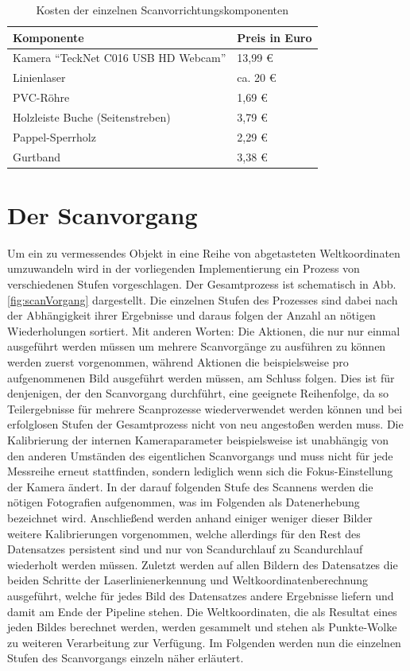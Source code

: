 \begin{table} %
	\centering
		\begin{tabular}{l | l}
		\textbf{Komponente} & \textbf{Preis in Euro}\\
		\hline
			Kamera "`TeckNet C016 USB HD Webcam"' & 13,99 \euro\\
			Linienlaser &  ca. 20 \euro\\
			PVC-Röhre & 1,69 \euro\\
			Holzleiste Buche (Seitenstreben) & 3,79 \euro\\
			Pappel-Sperrholz &  2,29 \euro\\
			Gurtband & 3,38 \euro
		\end{tabular}
	\caption{Kosten der einzelnen Scanvorrichtungskomponenten}
	\label{tab:preise}
\end{table}


\section{Der Scanvorgang}
\label{sec:scanvorgang}
Um ein zu vermessendes Objekt in eine Reihe von abgetasteten Weltkoordinaten umzuwandeln wird in der vorliegenden Implementierung ein Prozess von verschiedenen Stufen vorgeschlagen. Der Gesamtprozess ist schematisch in Abb. \ref{fig:scanVorgang} dargestellt. Die einzelnen Stufen des Prozesses sind dabei nach der Abhängigkeit ihrer Ergebnisse und daraus folgen der Anzahl an nötigen Wiederholungen sortiert. Mit anderen Worten: Die Aktionen, die nur nur einmal ausgeführt werden müssen um mehrere Scanvorgänge zu ausführen zu können werden zuerst vorgenommen, während Aktionen die beispielsweise pro aufgenommenen Bild ausgeführt werden müssen, am Schluss folgen. Dies ist für denjenigen, der den Scanvorgang durchführt, eine geeignete Reihenfolge, da so Teilergebnisse für mehrere Scanprozesse wiederverwendet werden können und bei erfolglosen Stufen der Gesamtprozess nicht von neu angestoßen werden muss. \bigbreak
Die Kalibrierung der internen Kameraparameter beispielsweise ist unabhängig von den anderen Umständen des eigentlichen Scanvorgangs und muss nicht für jede Messreihe erneut stattfinden, sondern lediglich wenn sich die Fokus-Einstellung der Kamera ändert. In der darauf folgenden Stufe des Scannens werden die nötigen Fotografien aufgenommen, was im Folgenden als Datenerhebung bezeichnet wird. Anschließend werden anhand einiger weniger dieser Bilder weitere Kalibrierungen vorgenommen, welche allerdings für den Rest des Datensatzes persistent sind und nur von Scandurchlauf zu Scandurchlauf wiederholt werden müssen. Zuletzt werden auf allen Bildern des Datensatzes die beiden Schritte der Laserlinienerkennung und Weltkoordinatenberechnung ausgeführt, welche für jedes Bild des Datensatzes andere Ergebnisse liefern und damit am Ende der Pipeline stehen. Die Weltkoordinaten, die als Resultat eines jeden Bildes berechnet werden, werden gesammelt und stehen als Punkte-Wolke zu weiteren Verarbeitung zur Verfügung. Im Folgenden werden nun die einzelnen Stufen des Scanvorgangs einzeln näher erläutert.



